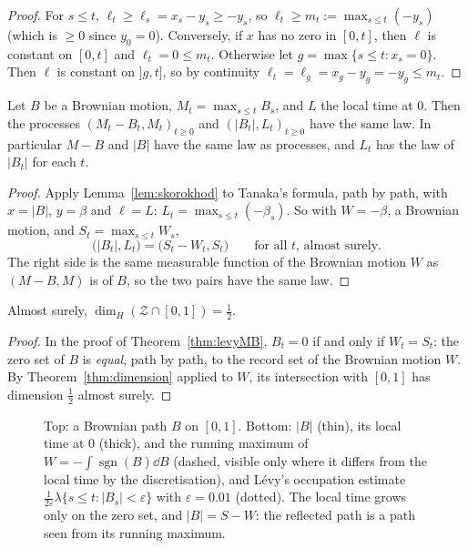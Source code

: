 \begin{proof}
For $s\le t$, $\ell_t\ge\ell_s=x_s-y_s\ge-y_s$, so $\ell_t\ge m_t:=\max_{s\le t}(-y_s)$ (which is $\ge0$ since $y_0=0$). Conversely, if $x$ has no zero in $[0,t]$, then $\ell$ is constant on $[0,t]$ and $\ell_t=0\le m_t$. Otherwise let
$g=\max\{s\le t:x_s=0\}$. Then $\ell$ is constant on $]g,t]$, so by continuity $\ell_t=\ell_g=x_g-y_g=-y_g\le m_t$.
\end{proof}

\begin{theorem}[L\'evy, 1948]\label{thm:levyMB}
Let $B$ be a Brownian motion, $M_t=\max_{s\le t}B_s$, and $L$ the local time at $0$. Then the processes $(M_t-B_t,M_t)_{t\ge0}$ and $(|B_t|,L_t)_{t\ge0}$ have the same law. In particular $M-B$ and $|B|$ have the same
law as processes, and $L_t$ has the law of $|B_t|$ for each $t$.
\end{theorem}

\begin{proof}
Apply Lemma~\ref{lem:skorokhod} to Tanaka's formula, path by path, with $x=|B|$, $y=\beta$ and $\ell=L$: $L_t=\max_{s\le t}(-\beta_s)$. So with $W=-\beta$, a Brownian motion, and $S_t=\max_{s\le t}W_s$,
\[
\bigl(|B_t|,L_t\bigr)=\bigl(S_t-W_t,S_t\bigr)\qquad\text{for all }t\text{, almost surely.}
\]
The right side is the same measurable function of the Brownian motion $W$ as $(M-B,M)$ is of $B$, so the two pairs have the same law.
\end{proof}

\begin{corollary}\label{cor:zerodim}
Almost surely, $\dim_H(\mathcal Z\cap[0,1])=\frac12$.
\end{corollary}

\begin{proof}
In the proof of Theorem~\ref{thm:levyMB}, $B_t=0$ if and only if $W_t=S_t$: the zero set of $B$ is \emph{equal}, path by path, to the record set of the Brownian motion $W$. By Theorem~\ref{thm:dimension} applied to $W$,
its intersection with $[0,1]$ has dimension $\frac12$ almost surely.
\end{proof}

\begin{figure}[ht]
\centering
{}
\caption{Top: a Brownian path $B$ on $[0,1]$. Bottom: $|B|$ (thin), its local time at $0$ (thick), and the running maximum of $W=-\int\operatorname{sgn}(B)\dd B$ (dashed, visible only where it differs from the
local time by the discretisation), and L\'evy's occupation estimate $\frac1{2\varepsilon}\lambda\{s\le t:|B_s|<\varepsilon\}$ with $\varepsilon=0.01$ (dotted). The local time grows only on the zero set, and $|B|=S-W$: the reflected path is a path seen from its running maximum.}
\label{fig:tanaka}
\end{figure}

